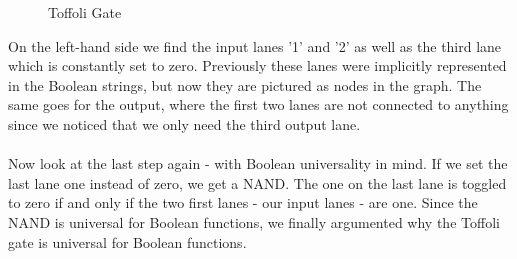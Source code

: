 \documentclass[oneside]{thesisclass}
\begin{document}
\begin{figure}
 \begin{center}
  \caption{Toffoli Gate}
  \label{andP}
 \end{center}
\end{figure}
On the left-hand side we find the input lanes '1' and '2' as well as the third lane which is constantly set to zero.
Previously these lanes were implicitly represented in the Boolean strings, but now they are pictured as nodes in the graph.
The same goes for the output, where the first two lanes are not connected to anything since we noticed that we only need the third output lane.\\
\\Now look at the last step again - with Boolean universality in mind.
If we set the last lane one instead of zero, we get a NAND.
The one on the last lane is toggled to zero if and only if the two first lanes - our input lanes - are one.
Since the NAND is universal for Boolean functions, we finally argumented why the Toffoli gate is universal for Boolean functions.\\
\end{document}
